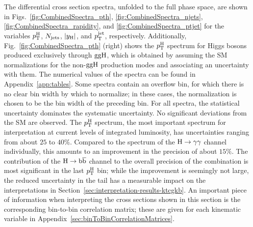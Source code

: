 The differential cross section spectra, unfolded to the full phase space, are shown in Figs.~\ref{fig:CombinedSpectra_pth}, \ref{fig:CombinedSpectra_njets}, \ref{fig:CombinedSpectra_rapidity}, and \ref{fig:CombinedSpectra_ptjet} for the variables $p_\mathrm{T}^\mathrm{H}$, $N_\text{jets} $, $\left|y_\mathrm{H}\right| $, and $p_\mathrm{T}^\text{jet} $, respectively.
% 
Additionally, Fig.~\ref{fig:CombinedSpectra_pth} (right) shows the $p_\mathrm{T}^\mathrm{H}$ spectrum for Higgs bosons produced exclusively through $\mathrm{g}\mathrm{g}\mathrm{H}$, which is obtained by assuming the SM normalizations for the non-$\mathrm{g}\mathrm{g}\mathrm{H}$ production modes and associating an uncertainty with them.
% 
The numerical values of the spectra can be found in Appendix~\ref{app:tables}.
% 
Some spectra contain an overflow bin, for which there is no clear bin width by which to normalize; in these cases, the normalization is chosen to be the bin width of the preceding bin.
% 
For all spectra, the statistical uncertainty dominates the systematic uncertainty.
% 
No significant deviations from the SM are observed.
% 
The $p_\mathrm{T}^\mathrm{H}$ spectrum, the most important spectrum for interpretation at current levels of integrated luminosity, has uncertainties ranging from about $25$ to $40\%$.
% 
Compared to the spectrum of the $\mathrm{H}\to\mathrm{\gamma}\mathrm{\gamma}$ channel individually, this amounts to an improvement in the precision of about $15\%$.
% 
The contribution of the $\mathrm{H}\to\mathrm{b}\overline{\mathrm{b}}$ channel to the overall precision of the combination is most significant in the last $p_\mathrm{T}^\mathrm{H}$ bin; while the improvement is seemingly not large, the reduced uncertainty in the tail has a measurable impact on the interpretations in Section~\ref{sec:interpretation-results-ktcgkb}.
% 
An important piece of information when interpreting the cross sections shown in this section is the corresponding bin-to-bin correlation matrix; these are given for each kinematic variable in Appendix~\ref{sec:binToBinCorrelationMatrices}.


